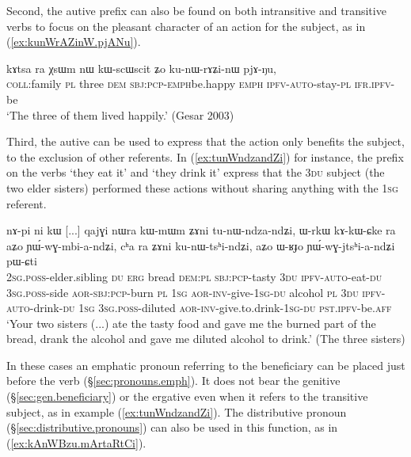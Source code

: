 Second, the autive prefix can also be found on both intransitive and transitive verbs to focus on the pleasant character of an action for the subject, as in (\ref{ex:kunWrAZinW.pjANu}).
 
\begin{exe}
\ex \label{ex:kunWrAZinW.pjANu}
\gll kɤtsa ra χsɯm nɯ kɯ-scɯ\redp{}scit ʑo ku-nɯ-rɤʑi-nɯ pjɤ-ŋu, \\
\textsc{coll}:family \textsc{pl} three \textsc{dem} \textsc{sbj}:\textsc{pcp}-\textsc{emph}\redp{}be.happy \textsc{emph} \textsc{ipfv}-\textsc{auto}-stay-\textsc{pl} \textsc{ifr}.\textsc{ipfv}-be \\
\glt `The three of them lived happily.' (Gesar 2003)
\end{exe}

 
Third, the autive  can be used to express that the action only benefits the subject, to the exclusion of other referents. In (\ref{ex:tunWndzandZi}) for instance, the  prefix on the verbs  `they eat it' and  `they drink it' express that the \textsc{3du} subject (the two elder sisters) performed these actions without sharing anything with the \textsc{1sg} referent.

\begin{exe}
\ex \label{ex:tunWndzandZi}
\gll nɤ-pi ni kɯ [...] qajɣi nɯra kɯ-mɯm ʑɤni tu-nɯ-ndza-ndʑi, ɯ-rkɯ kɤ-kɯ-ɕke ra aʑo ɲɯ́-wɣ-mbi-a-ndʑi, cʰa ra ʑɤni ku-nɯ-tsʰi-ndʑi, aʑo ɯ-ʁɟo ɲɯ́-wɣ-jtsʰi-a-ndʑi pɯ-ɕti      \\
\textsc{2sg}.\textsc{poss}-elder.sibling \textsc{du} \textsc{erg} {  } bread \textsc{dem}:\textsc{pl} \textsc{sbj}:\textsc{pcp}-tasty  \textsc{3du} \textsc{ipfv}-\textsc{auto}-eat-\textsc{du} \textsc{3sg}.\textsc{poss}-side \textsc{aor}-\textsc{sbj}:\textsc{pcp}-burn \textsc{pl}  \textsc{1sg} \textsc{aor}-\textsc{inv}-give-\textsc{1sg}-\textsc{du} alcohol \textsc{pl} \textsc{3du} \textsc{ipfv}-\textsc{auto}-drink-\textsc{du} \textsc{1sg} \textsc{3sg}.\textsc{poss}-diluted \textsc{aor}-\textsc{inv}-give.to.drink-\textsc{1sg}-\textsc{du} \textsc{pst}.\textsc{ipfv}-be.\textsc{aff}  \\
 \glt `Your two sisters (...) ate the tasty food and gave me the burned part of the bread, drank the alcohol and gave me diluted alcohol to drink.'  (The three sisters)
\end{exe} 

In these cases an emphatic pronoun referring to the beneficiary can be placed just before the verb (§\ref{sec:pronouns.emph}). It does not bear the genitive (§\ref{sec:gen.beneficiary}) or the ergative  even when it refers to the transitive subject, as  in example (\ref{ex:tunWndzandZi}).  The distributive pronoun  (§\ref{sec:distributive.pronouns}) can also be used in this function, as in (\ref{ex:kAnWBzu.mArtaRtCi}).

